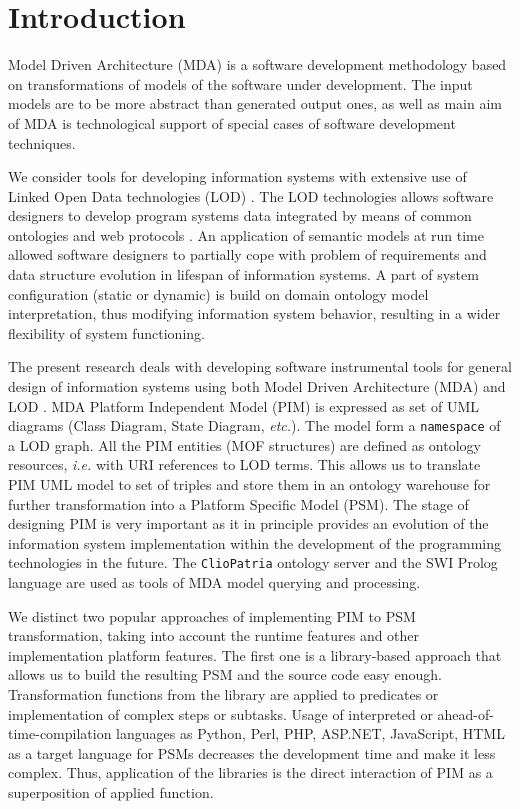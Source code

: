 \documentclass[conference,a4paper]{IEEEtran}
\begin{document}
\section{Introduction}

Model Driven Architecture (MDA) is a software development methodology based on transformations of models of the software under development.  The input models are to be more abstract than generated output ones, as well as main aim of MDA is technological support of special cases of software development techniques.

We consider tools for developing information systems with extensive use of Linked Open Data technologies (LOD) \cite{Bizer}.  The LOD technologies allows software designers to develop program systems data integrated by means of common ontologies and web protocols \cite{Cherk}.  An application of semantic models at run time \cite{Kopay} allowed software designers to partially cope with problem of requirements and data structure evolution in lifespan of information systems.  A part of system configuration (static or dynamic) is build on domain ontology model interpretation, thus modifying information system behavior, resulting in a wider flexibility of system functioning.

The present research deals with developing software instrumental tools for general design of information systems using both Model Driven Architecture (MDA) and LOD \cite{MDA}.  MDA Platform Independent Model (PIM) is expressed as set of UML diagrams (Class Diagram, State Diagram, \emph{etc.}).  The model form a \verb~namespace~ of a LOD graph.  All the PIM entities (MOF structures) are defined as ontology resources, \emph{i.e.} with URI references to LOD terms.  This allows us to translate PIM UML model to set of triples and store them in an ontology warehouse for further transformation into a Platform Specific Model (PSM). The stage of designing PIM is very important as it in principle provides an evolution of the information system implementation within the development of the programming technologies in the future. %
The \verb~ClioPatria~ ontology server and the SWI Prolog language \cite{Clio} are used as tools of MDA model querying and processing.

We distinct two popular approaches of implementing PIM to PSM transformation, taking into account the runtime features and other implementation platform features.  The first one is a library-based approach that allows us to build the resulting PSM and the source code easy enough.  Transformation functions from the library are applied to predicates or implementation of complex steps or subtasks. Usage of interpreted or ahead-of-time-compilation languages as Python, Perl, PHP, ASP.NET, JavaScript, HTML as a target language for PSMs decreases the development time and make it less complex.  Thus, application of the libraries is the direct interaction of PIM as a superposition of applied function.
\end{document}
